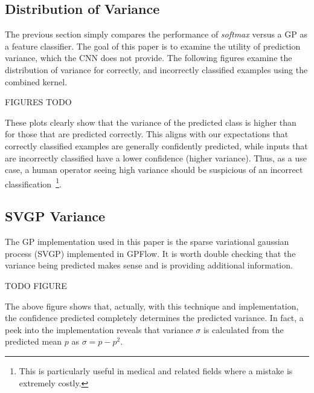 \documentclass{article}
\begin{document}


\subsection{Distribution of Variance}

The previous section simply compares the performance of \textit{softmax} versus a GP as a feature classifier. The goal of this paper is to examine the utility of prediction variance, which the CNN does not provide. The following figures examine the distribution of variance for correctly, and incorrectly classified examples using the combined kernel.

FIGURES TODO

These plots clearly show that the variance of the predicted class is higher than for those that are predicted correctly. This aligns with our expectations that correctly classified examples are generally confidently predicted, while inputs that are incorrectly classified have a lower confidence (higher variance). Thus, as a use case, a human operator seeing high variance should be suspicious of an incorrect classification~\footnote{This is particularly useful in medical and related fields where a mistake is extremely costly.}.




\subsection{SVGP Variance}

The GP implementation used in this paper is the sparse variational gaussian process (SVGP) implemented in GPFlow. It is worth double checking that the variance being predicted makes sense and is providing additional information.

TODO FIGURE

The above figure shows that, actually, with this technique and implementation, the confidence predicted completely determines the predicted variance. In fact, a peek into the implementation reveals that variance $\sigma$ is calculated from the predicted mean $p$ as $\sigma = p - p^2$.
\end{document}
